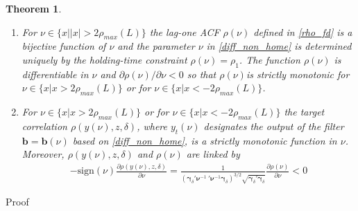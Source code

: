 \documentclass[a4paper]{article}
\newtheorem{Theorem}{Theorem}
\begin{document}
\begin{Theorem}
\begin{enumerate}
\item \label{ass4} For $\nu\in\{x||x|>2\rho_{max}(L)\}$ %
the lag-one ACF $\rho(\nu)$ defined in \ref{rho_fd} is a bijective function of $\nu$ and the parameter  $\nu$  in \ref{diff_non_home} is determined uniquely by the holding-time constraint $\rho(\nu)=\rho_1$. The function $\rho(\nu)$ is differentiable in $\nu$ and $\partial \rho(\nu)/\partial\nu<0$ so that $\rho(\nu)$is strictly monotonic for $\nu\in\{x|x>2\rho_{max}(L)\}$ or for $\nu\in\{x|x<-2\rho_{max}(L)\}$. 
\item \label{ass5} For $\nu\in\{x|x>2\rho_{max}(L)\}$ or for $\nu\in\{x|x<-2\rho_{max}(L)\}$ %
the target correlation $\rho(y(\nu),z,\delta)$, where $y_t(\nu)$ designates the output of the filter $\mathbf{b}=\mathbf{b}(\nu)$ based on \ref{diff_non_home},  is a strictly monotonic function in $\nu$. Moreover, $\rho(y(\nu),z,\delta)$ and $\rho(\nu)$ are linked by 
\begin{eqnarray}\label{ficcc}
-\textrm{sign}(\nu)\frac{\partial\rho(y(\nu),z,\delta)}{\partial\nu}=\frac{1}{\left(\boldsymbol{\gamma}_{\delta}'\boldsymbol{\nu}^{-1}~'\boldsymbol{\nu}^{-1}\boldsymbol{\gamma}_{\delta}\right)^{3/2}\sqrt{\boldsymbol{\gamma}_{\delta}'\boldsymbol{\gamma}_{\delta}}}\frac{\partial\rho(\nu)}{\partial\nu}<0
\end{eqnarray} 
\end{enumerate}
\end{Theorem}



Proof\\
\end{document}
